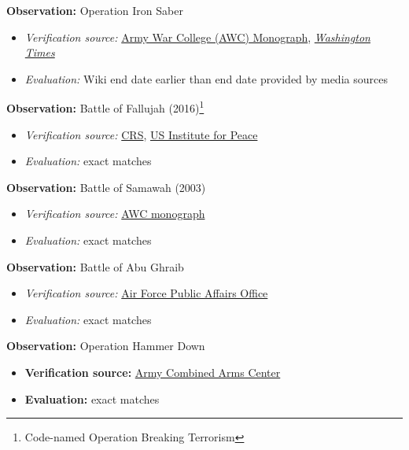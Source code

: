 \documentclass[fleqn,12pt]{article}
\begin{document}
\vspace{-.3cm}
\noindent
\textbf{Observation:} Operation Iron Saber
\begin{itemize}
    \item \textit{Verification source:} \href{https://www.armyupress.army.mil/Portals/7/military-review/Archives/English/MilitaryReview_20100930ER_art016.pdf}{Army War College (AWC) Monograph}, \href{https://www.washingtontimes.com/news/2004/jun/22/20040622-113720-3352r/}{\textit{Washington Times}}
    \item \textit{Evaluation:} Wiki end date earlier than end date provided by media sources
\end{itemize}

\vspace{-.3cm}
\noindent
\textbf{Observation:} Battle of Fallujah (2016)\footnote{Code-named Operation Breaking Terrorism}
\begin{itemize}
    \item \textit{Verification source:} \href{https://crsreports.congress.gov/product/pdf/R/R45025/4}{CRS}, \href{https://www.usip.org/iraq-timeline-2003-war}{US Institute for Peace}
    \item \textit{Evaluation:} exact matches
\end{itemize}

\vspace{-.3cm}
\noindent
\textbf{Observation:} Battle of Samawah (2003)
\begin{itemize}
    \item \textit{Verification source:} \href{https://apps.dtic.mil/sti/pdfs/AD1066345.pdf}{AWC monograph}
    \item \textit{Evaluation:} exact matches
\end{itemize}

\vspace{-.3cm}
\noindent
\textbf{Observation:} Battle of Abu Ghraib
\begin{itemize}
    \item \textit{Verification source:} \href{https://www.af.mil/News/Article-Display/Article/134452/air-force-medics-treat-patients-at-abu-ghraib/}{Air Force Public Affairs Office}
    \item \textit{Evaluation:} exact matches
\end{itemize}

\vspace{-.3cm}
\noindent
\textbf{Observation:} Operation Hammer Down
\begin{itemize}
    \item \textbf{Verification source:} \href{http://cacti35th.com/active/HammerDown.pdf}{Army Combined Arms Center}
    \item \textbf{Evaluation:} exact matches
\end{itemize}
\end{document}
